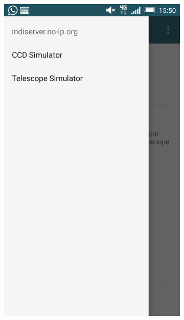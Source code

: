 \begin{figure}
    \centering
    \begin{subfigure}[]{0.4\textwidth}
        \includegraphics[width=\textwidth]{../images/captura3.png}
        \caption{}
        \label{fig:captura3}
    \end{subfigure}
    \begin{subfigure}[]{0.4\textwidth}

\end{subfigure}
\end{figure}
